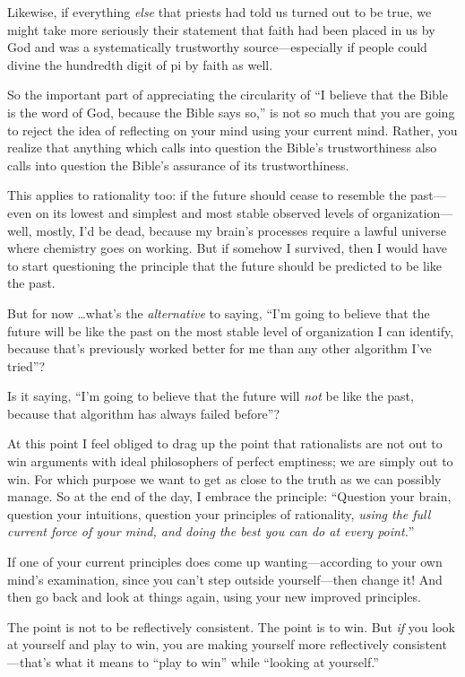 {
 Likewise, if everything \textit{else} that priests had told us
turned out to be true, we might take more seriously their statement
that faith had been placed in us by God and was a systematically
trustworthy source---especially if people could divine the hundredth
digit of pi by faith as well.}

{
 So the important part of appreciating the circularity of
``I believe that the Bible is the word of God, because
the Bible says so,'' is not so much that you are
going to reject the idea of reflecting on your mind using your current
mind. Rather, you realize that anything which calls into question the
Bible's trustworthiness also calls into question the
Bible's assurance of its trustworthiness.}

{
 This applies to rationality too: if the future should cease to
resemble the past---even on its lowest and simplest and most stable
observed levels of organization---well, mostly, I'd be
dead, because my brain's processes require a lawful
universe where chemistry goes on working. But if somehow I survived,
then I would have to start questioning the principle that the future
should be predicted to be like the past.}

{
 But for now \ldots what's the \textit{alternative}
to saying, ``I'm going to believe that
the future will be like the past on the most stable level of
organization I can identify, because that's previously
worked better for me than any other algorithm I've
tried''?}

{
 Is it saying, ``I'm going to
believe that the future will \textit{not} be like the past, because
that algorithm has always failed before''?}

{
 At this point I feel obliged to drag up the point that
rationalists are not out to win arguments with ideal philosophers of
perfect emptiness; we are simply out to win. For which purpose we want
to get as close to the truth as we can possibly manage. So at the end
of the day, I embrace the principle: ``Question your
brain, question your intuitions, question your principles of
rationality, \textit{using the full current force of your mind, and
doing the best you can do at every point.}''}

{
 If one of your current principles does come up wanting---according
to your own mind's examination, since you
can't step outside yourself{}---then change it! And
then go back and look at things again, using your new improved
principles.}

{
 The point is not to be reflectively consistent. The point is to
win. But \textit{if} you look at yourself and play to win, you are
making yourself more reflectively consistent---that's
what it means to ``play to win''
while ``looking at yourself.''}

